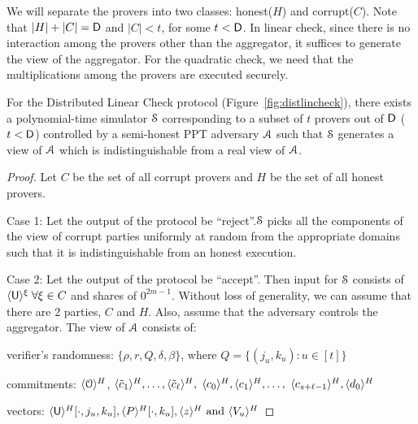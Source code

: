 We will separate the provers into two classes: honest($H$) and corrupt($C$). Note that $|H|+|C|=\mathsf{D}$ and $|C|<t$, for some $t<\mathsf{D}$. In linear check, since there is no interaction among the provers other than the aggregator, it suffices to generate the view of the aggregator. For the quadratic check, we need that the multiplications among the provers are executed securely.
\begin{lemma}\label{lem:WHlin}
	For the Distributed Linear Check protocol (Figure~\ref{fig:distlincheck}), there exists a polynomial-time simulator $\mathcal{S}$ corresponding to a subset of $t$ provers out of $\mathsf{D}$ ($t < \mathsf{D}$) controlled by a semi-honest PPT adversary $\mathcal{A}$ such that $\mathcal{S}$ generates a view of $\mathcal{A}$ which is indistinguishable from a real view of $\mathcal{A}$.
\end{lemma}
\begin{proof}
	Let $C$ be the set of all corrupt provers and $H$ be the set of all honest provers.
	
	Case 1: Let the output of the protocol be ``reject''.$\mathcal{S}$ picks all the components of the view of corrupt parties uniformly at random from the appropriate domains such that it is indistinguishable from an honest execution.
	
	Case 2: Let the output of the protocol be ``accept''. Then input for $\mathcal{S}$ consists of $\langle{\mathsf{U}}\rangle^\xi \; \forall \xi\in C$ and shares of $0^{2m-1}$. Without loss of generality, we can assume that there are 2 parties, $C$ and $H$. Also, assume that the adversary controls the aggregator. The view of $\mathcal{A}$ consists of:
	
	\noindent verifier's randomness: $\{\rho, r, Q, \delta, \beta\}$, where $Q=\{(j_u,k_u):u\in[t]\}$
	
	\noindent commitments: $\langle{\mathcal{O}}\rangle^H$, $\langle{\tilde{c}_1}\rangle^H,\ldots,\langle{\tilde{c}_{\ell}}\rangle^H,$ $\langle{c_0}\rangle^H, \langle{c_1}\rangle^H, \ldots,$ $\langle{c_{s+\ell-1}}\rangle^H, \langle{d_0}\rangle^H$
	
	\noindent vectors: $\langle{\mathsf{U}}\rangle^H[\cdot,j_u,k_u], \langle{P}\rangle^H[\cdot,k_u], \langle{z}\rangle^H \text{ and } \langle{V_u}\rangle^H$
	

\end{proof}
